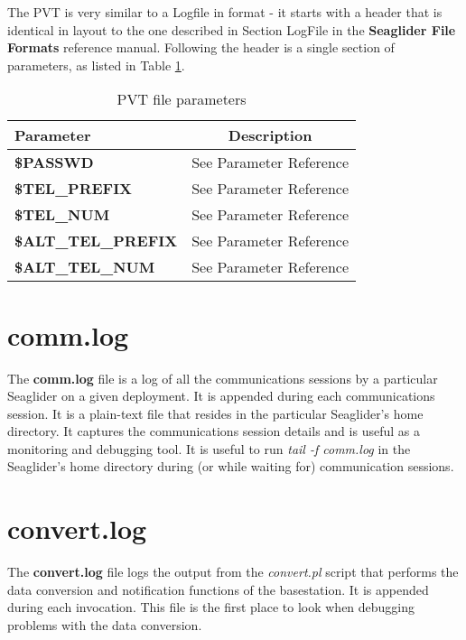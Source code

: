 \documentclass[12pt,english,twoside]{book}
\providecommand{\tabularnewline}{\\}
\begin{document}
The PVT is very similar to a Logfile in format - it starts with a header that is
identical in layout to the one described in Section LogFile in the
\textbf{Seaglider File Formats} reference manual. Following the header is a
single section of parameters, as listed in Table \ref{PVTParameters}.

%
\begin{table}
\begin{centering}\begin{tabular}{|l|c|}
\hline 
\textbf{Parameter} &
\textbf{Description} \tabularnewline
\hline 
\textbf{\$PASSWD} &
See Parameter Reference\tabularnewline
\hline 
\textbf{\$TEL\_PREFIX} &
See Parameter Reference\tabularnewline
\hline 
\textbf{\$TEL\_NUM} &
See Parameter Reference\tabularnewline
\hline 
\textbf{\$ALT\_TEL\_PREFIX} &
See Parameter Reference\tabularnewline
\hline 
\textbf{\$ALT\_TEL\_NUM} &
See Parameter Reference\tabularnewline
\hline
\end{tabular}\par\end{centering}


\caption{PVT file parameters}

\label{PVTParameters} 
\end{table}



\section{comm.log}

The \textbf{comm.log} file is a log of all the communications sessions
by a particular Seaglider on a given deployment. It is appended during
each communications session. It is a plain-text file that resides
in the particular Seaglider's home directory. It captures the communications
session details and is useful as a monitoring and debugging tool.
It is useful to run \emph{tail -f comm.log} in the Seaglider's home
directory during (or while waiting for) communication sessions.


\section{convert.log}

The \textbf{convert.log} file logs the output from the \emph{convert.pl}
script that performs the data conversion and notification functions
of the basestation. It is appended during each invocation. This file
is the first place to look when debugging problems with the data conversion. 
\end{document}
